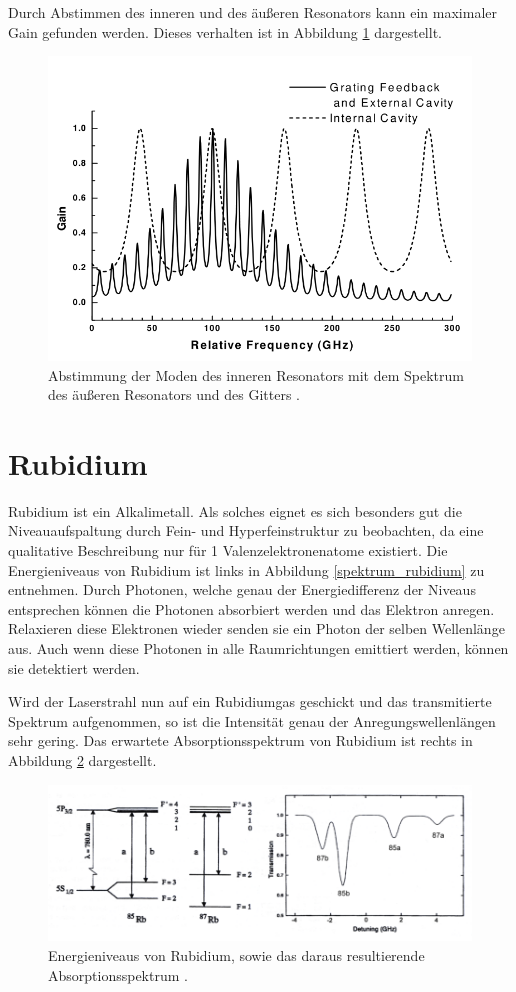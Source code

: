Durch Abstimmen des inneren und des äußeren Resonators kann ein maximaler Gain gefunden werden. Dieses verhalten ist in Abbildung \ref{fig:moden} dargestellt.

\begin{figure}
    \centering
    \includegraphics[scale=0.55]{bilder/moden.png}
    \caption{Abstimmung der Moden des inneren Resonators mit dem Spektrum des äußeren Resonators und des Gitters \cite{diode_laser_spectroscopy}.}
    \label{fig:moden}
\end{figure}

\section{Rubidium}
\label{sec:rub}

Rubidium ist ein Alkalimetall. Als solches eignet es sich besonders gut die Niveauaufspaltung durch Fein- und Hyperfeinstruktur zu beobachten, da eine qualitative Beschreibung nur 
für 1 Valenzelektronenatome existiert. Die Energieniveaus von Rubidium ist links in Abbildung \ref{spektrum_rubidium} zu entnehmen. Durch Photonen, welche genau der Energiedifferenz der Niveaus 
entsprechen können die Photonen absorbiert werden und das Elektron anregen. Relaxieren diese Elektronen wieder senden sie ein Photon der selben Wellenlänge aus. Auch wenn diese 
Photonen in alle Raumrichtungen emittiert werden, können sie detektiert werden.

Wird der Laserstrahl nun auf ein Rubidiumgas geschickt und das transmitierte Spektrum aufgenommen, so ist die Intensität genau der Anregungswellenlängen sehr gering. Das erwartete 
Absorptionsspektrum von Rubidium ist rechts in Abbildung \ref{fig:spektrum_rubidium} dargestellt.

\begin{figure}
    \centering
    \includegraphics[scale=0.55]{bilder/spektrum_rubidium.png}
    \caption{Energieniveaus von Rubidium, sowie das daraus resultierende Absorptionsspektrum \cite{diode_laser_spectroscopy}.}
    \label{fig:spektrum_rubidium}
\end{figure}
